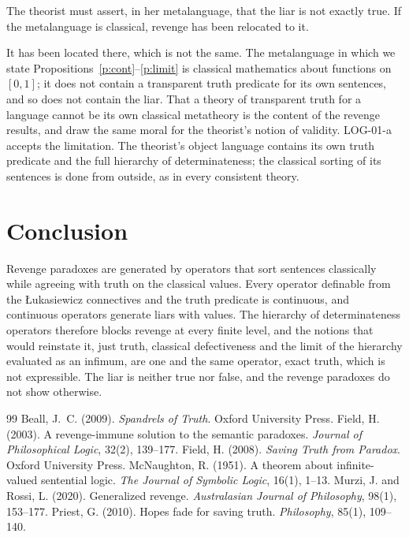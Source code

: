 \documentclass{situationist-preprint}
\begin{document}
\begin{objection}
The theorist must assert, in her metalanguage, that the liar is not exactly true. If the metalanguage is classical, revenge has been relocated to it.
\end{objection}

\begin{reply}
It has been located there, which is not the same. The metalanguage in which we state Propositions~\ref{p:cont}--\ref{p:limit} is classical mathematics about functions on $[0,1]$; it does not contain a transparent truth predicate for its own sentences, and so does not contain the liar. That a theory of transparent truth for a language cannot be its own classical metatheory is the content of the revenge results, and \citet{MurziRossi2020} draw the same moral for the theorist's notion of validity. LOG-01-a accepts the limitation. The theorist's object language contains its own truth predicate and the full hierarchy of determinateness; the classical sorting of its sentences is done from outside, as in every consistent theory.
\end{reply}

\section{Conclusion}

Revenge paradoxes are generated by operators that sort sentences classically while agreeing with truth on the classical values. Every operator definable from the Łukasiewicz connectives and the truth predicate is continuous, and continuous operators generate liars with values. The hierarchy of determinateness operators therefore blocks revenge at every finite level, and the notions that would reinstate it, just truth, classical defectiveness and the limit of the hierarchy evaluated as an infimum, are one and the same operator, exact truth, which is not expressible. The liar is neither true nor false, and the revenge paradoxes do not show otherwise.

\begin{thebibliography}{99}\small
{} Beall, J.~C. (2009). \emph{Spandrels of Truth}. Oxford University Press.
 Field, H. (2003). A revenge-immune solution to the semantic paradoxes. \emph{Journal of Philosophical Logic}, 32(2), 139--177.
 Field, H. (2008). \emph{Saving Truth from Paradox}. Oxford University Press.
 McNaughton, R. (1951). A theorem about infinite-valued sentential logic. \emph{The Journal of Symbolic Logic}, 16(1), 1--13.
 Murzi, J. and Rossi, L. (2020). Generalized revenge. \emph{Australasian Journal of Philosophy}, 98(1), 153--177.
 Priest, G. (2010). Hopes fade for saving truth. \emph{Philosophy}, 85(1), 109--140.
\end{thebibliography}
\end{document}
